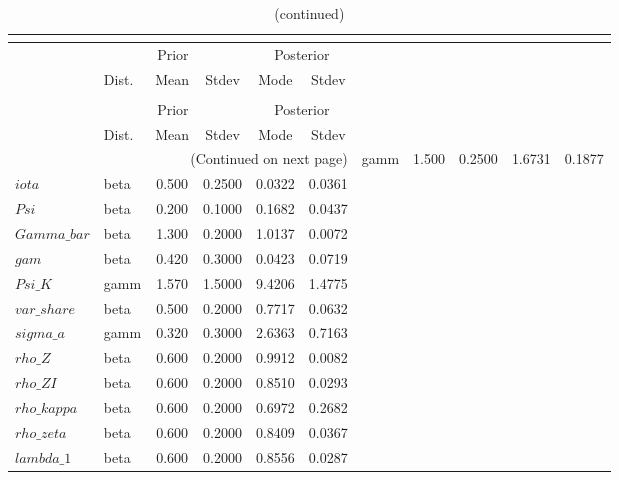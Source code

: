  
\begin{center}
\begin{longtable}{llcccc} 
\caption{Results from posterior maximization (parameters)}\\
 \label{Table:Posterior:1}\\
\toprule 
  & \multicolumn{3}{c}{Prior}  &  \multicolumn{2}{c}{Posterior} \\
  \cmidrule(r{.75em}){2-4} \cmidrule(r{.75em}){5-6}
  & Dist. & Mean  & Stdev & Mode & Stdev \\ 
\midrule \endfirsthead 
\caption{(continued)}\\
 \bottomrule 
  & \multicolumn{3}{c}{Prior}  &  \multicolumn{2}{c}{Posterior} \\
  \cmidrule(r{.75em}){2-4} \cmidrule(r{.75em}){5-6}
  & Dist. & Mean  & Stdev & Mode & Stdev \\ 
\midrule \endhead 
\bottomrule \multicolumn{6}{r}{(Continued on next page)}\endfoot 
\bottomrule\endlastfoot 
$sigma$ & gamm &   1.500 & 0.2500 &   1.6731 &  0.1877 \\ 
$iota$ & beta &   0.500 & 0.2500 &   0.0322 &  0.0361 \\ 
$Psi$ & beta &   0.200 & 0.1000 &   0.1682 &  0.0437 \\ 
$Gamma\_bar$ & beta &   1.300 & 0.2000 &   1.0137 &  0.0072 \\ 
$gam$ & beta &   0.420 & 0.3000 &   0.0423 &  0.0719 \\ 
$Psi\_K$ & gamm &   1.570 & 1.5000 &   9.4206 &  1.4775 \\ 
$var\_share$ & beta &   0.500 & 0.2000 &   0.7717 &  0.0632 \\ 
$sigma\_a$ & gamm &   0.320 & 0.3000 &   2.6363 &  0.7163 \\ 
$rho\_Z$ & beta &   0.600 & 0.2000 &   0.9912 &  0.0082 \\ 
$rho\_ZI$ & beta &   0.600 & 0.2000 &   0.8510 &  0.0293 \\ 
$rho\_kappa$ & beta &   0.600 & 0.2000 &   0.6972 &  0.2682 \\ 
$rho\_zeta$ & beta &   0.600 & 0.2000 &   0.8409 &  0.0367 \\ 
$lambda\_1$ & beta &   0.600 & 0.2000 &   0.8556 &  0.0287 \\ 
\end{longtable}
 \end{center}
